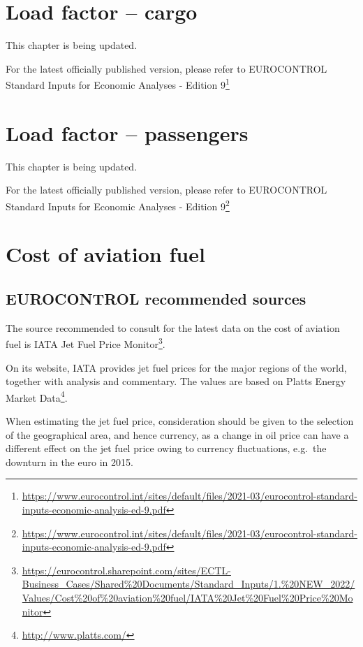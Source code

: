 \documentclass[
  11pt,
  a4paper,
]{book}
\DeclareRobustCommand{\href}[2]{#2\footnote{\url{#1}}}
\begin{document}
\hypertarget{sec-load-factor-cargo}{%
\chapter{Load factor -- cargo}\label{sec-load-factor-cargo}}

This chapter is being updated.

For the latest officially published version, please refer to
\href{https://www.eurocontrol.int/sites/default/files/2021-03/eurocontrol-standard-inputs-economic-analysis-ed-9.pdf}{EUROCONTROL
Standard Inputs for Economic Analyses - Edition 9}

\hypertarget{sec-load-factor-passengers}{%
\chapter{Load factor -- passengers}\label{sec-load-factor-passengers}}

This chapter is being updated.

For the latest officially published version, please refer to
\href{https://www.eurocontrol.int/sites/default/files/2021-03/eurocontrol-standard-inputs-economic-analysis-ed-9.pdf}{EUROCONTROL
Standard Inputs for Economic Analyses - Edition 9}

\hypertarget{sec-cost-of-aviation-fuel}{%
\chapter{Cost of aviation fuel}\label{sec-cost-of-aviation-fuel}}

\hypertarget{eurocontrol-recommended-sources-1}{%
\section{EUROCONTROL recommended
sources}\label{eurocontrol-recommended-sources-1}}

The source recommended to consult for the latest data on the cost of
aviation fuel is
\href{https://eurocontrol.sharepoint.com/sites/ECTL-Business_Cases/Shared\%20Documents/Standard_Inputs/1.\%20NEW_2022/Values/Cost\%20of\%20aviation\%20fuel/IATA\%20Jet\%20Fuel\%20Price\%20Monitor}{IATA
Jet Fuel Price Monitor}.

On its website, IATA provides jet fuel prices for the major regions of
the world, together with analysis and commentary. The values are based
on \href{http://www.platts.com/}{Platts Energy Market Data}.

When estimating the jet fuel price, consideration should be given to the
selection of the geographical area, and hence currency, as a change in
oil price can have a different effect on the jet fuel price owing to
currency fluctuations, e.g.~the downturn in the euro in 2015.
\end{document}
